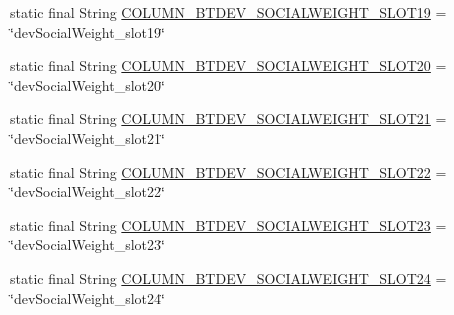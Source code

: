 \begin{DoxyCompactItemize}
static final String \hyperlink{classcom_1_1social_1_1proximity_1_1_s_q_lite_helper_a922ea6d87617bdd176083bff3c930e8c}{C\+O\+L\+U\+M\+N\+\_\+\+B\+T\+D\+E\+V\+\_\+\+S\+O\+C\+I\+A\+L\+W\+E\+I\+G\+H\+T\+\_\+\+S\+L\+O\+T19} = \char`\"{}dev\+Social\+Weight\+\_\+slot19\char`\"{}
\item 
static final String \hyperlink{classcom_1_1social_1_1proximity_1_1_s_q_lite_helper_afa9d11d75fd116d78e17cc13eb917f84}{C\+O\+L\+U\+M\+N\+\_\+\+B\+T\+D\+E\+V\+\_\+\+S\+O\+C\+I\+A\+L\+W\+E\+I\+G\+H\+T\+\_\+\+S\+L\+O\+T20} = \char`\"{}dev\+Social\+Weight\+\_\+slot20\char`\"{}
\item 
static final String \hyperlink{classcom_1_1social_1_1proximity_1_1_s_q_lite_helper_ad8bc64cd84ccb74a9511ac6964499e55}{C\+O\+L\+U\+M\+N\+\_\+\+B\+T\+D\+E\+V\+\_\+\+S\+O\+C\+I\+A\+L\+W\+E\+I\+G\+H\+T\+\_\+\+S\+L\+O\+T21} = \char`\"{}dev\+Social\+Weight\+\_\+slot21\char`\"{}
\item 
static final String \hyperlink{classcom_1_1social_1_1proximity_1_1_s_q_lite_helper_ad4c99b480a345c22fc43bc298c43a2ac}{C\+O\+L\+U\+M\+N\+\_\+\+B\+T\+D\+E\+V\+\_\+\+S\+O\+C\+I\+A\+L\+W\+E\+I\+G\+H\+T\+\_\+\+S\+L\+O\+T22} = \char`\"{}dev\+Social\+Weight\+\_\+slot22\char`\"{}
\item 
static final String \hyperlink{classcom_1_1social_1_1proximity_1_1_s_q_lite_helper_a52e7f4d707bc6b90bade10abaee77851}{C\+O\+L\+U\+M\+N\+\_\+\+B\+T\+D\+E\+V\+\_\+\+S\+O\+C\+I\+A\+L\+W\+E\+I\+G\+H\+T\+\_\+\+S\+L\+O\+T23} = \char`\"{}dev\+Social\+Weight\+\_\+slot23\char`\"{}
\item 
static final String \hyperlink{classcom_1_1social_1_1proximity_1_1_s_q_lite_helper_adf47474141453dfa6343838e2f69b0ea}{C\+O\+L\+U\+M\+N\+\_\+\+B\+T\+D\+E\+V\+\_\+\+S\+O\+C\+I\+A\+L\+W\+E\+I\+G\+H\+T\+\_\+\+S\+L\+O\+T24} = \char`\"{}dev\+Social\+Weight\+\_\+slot24\char`\"{}
\end{DoxyCompactItemize}
